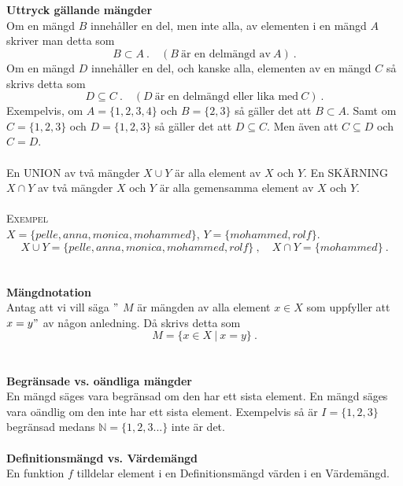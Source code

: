 \documentclass{article}
\begin{document}
\\ \\
\textbf{Uttryck gällande mängder}
\\
Om en mängd $B$ innehåller en del, men inte alla, av elementen i en mängd $A$ skriver man detta som
\begin{equation*}
    B\subset A \ . \quad (B \ \textrm{är en delmängd av} \ A) \ .
\end{equation*}
Om en mängd $D$ innehåller en del, och kanske alla, elementen av en mängd $C$ så skrivs detta som
\begin{equation*}
    D\subseteq C \ . \quad (D \ \textrm{är en delmängd eller lika med} \ C) \ . 
\end{equation*}
Exempelvis, om $A=\{1,2,3,4\}$ och $B=\{2,3\}$ så gäller det att $B\subset A$. Samt om $C=\{1,2,3\}$ och $D=\{1,2,3\}$ så gäller det att $D\subseteq C$. Men även att $C\subseteq D$ och $C=D$. 
\\ \\
En UNION av två mängder $X\cup Y$ är alla element av $X$ och $Y$. En SKÄRNING $X\cap Y$ av två mängder $X$ och $Y$ är alla gemensamma element av $X$ och $Y$.
\\ \\
\textsc{Exempel}
\\
$X=\{pelle,anna,monica,mohammed\}$, $Y=\{mohammed,rolf\}$.
\begin{equation*}
    X\cup Y = \{pelle,anna,monica,mohammed,rolf\} \ , \quad X\cap Y=\{mohammed\} \ .
\end{equation*}
\\ \\
\textbf{Mängdnotation}
\\
Antag att vi vill säga $"$ $M$ är mängden av alla element $x\in X$ som uppfyller att $x=y"$ av någon anledning. Då skrivs detta som
\begin{equation*}
   M = \{x\in X \ | \ x=y\} \ .
\end{equation*}
\\ \\
\textbf{Begränsade vs. oändliga mängder}
\\
En mängd säges vara begränsad om den har ett sista element. En mängd säges vara oändlig om den inte har ett sista element. Exempelvis så är $I=\{1,2,3\}$ begränsad medans $\mathbb{N}=\{1,2,3...\}$ inte är det.
\\ \\
\textbf{Definitionsmängd vs. Värdemängd} 
\\
En funktion $f$ tilldelar element i en Definitionsmängd värden i en Värdemängd.
\end{document}
